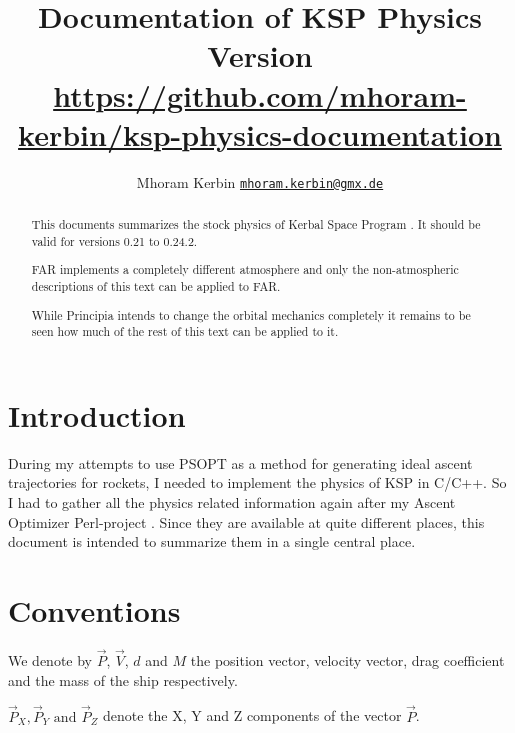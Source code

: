 \documentclass[11pt]{article}
\newcommand{\oa}[1]{\overrightarrow{#1}}
\newcommand{\Pos}{\oa{P}}
\newcommand{\Vel}{\oa{V}}
\begin{document}
\title{Documentation of KSP Physics\\\small{Version }\\\vspace{1 em}\url{https://github.com/mhoram-kerbin/ksp-physics-documentation}}
\author {Mhoram Kerbin \href{mailto:mhoram.kerbin@gmx.de}{\nolinkurl{mhoram.kerbin@gmx.de}}}

\maketitle

\begin{abstract}

  This documents summarizes the stock physics of Kerbal Space Program
  \cite{KSP}. It should be valid for versions 0.21 to 0.24.2.

  FAR \cite{FAR} implements a completely different atmosphere and only
  the non-atmospheric descriptions of this text can be applied to FAR.

  While Principia \cite{principia} intends to change the orbital
  mechanics completely it remains to be seen how much of the rest of
  this text can be applied to it.

\end{abstract}

\tableofcontents

\section{Introduction}

During my attempts to use PSOPT as a method for generating ideal
ascent trajectories for rockets, I needed to implement the physics of
KSP in C/C++. So I had to gather all the physics related information
again after my Ascent Optimizer Perl-project \cite{PAO}. Since they
are available at quite different places, this document is intended to
summarize them in a single central place.

\section{Conventions}

We denote by $\Pos$, $\Vel$, $d$ and $M$ the position vector, velocity
vector, drag coefficient and the mass of the ship respectively.

$\Pos_X, \Pos_Y \textrm{ and } \Pos_Z$ denote the X, Y and Z
components of the vector $\Pos$.
\end{document}
